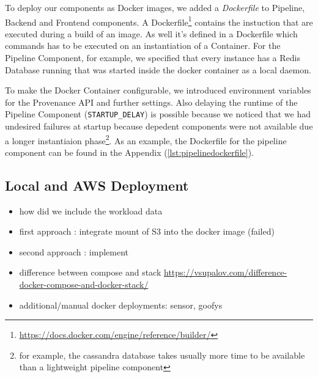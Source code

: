 To deploy our components as Docker images, we added a \emph{Dockerfile} to Pipeline, Backend and Frontend components. A Dockerfile\footnote{\url{https://docs.docker.com/engine/reference/builder/}} contains the instuction that are executed during a build of an image. As well it's defined in a Dockerfile which commands has to be executed on an instantiation of a Container. For the Pipeline Component, for example, we specified that every instance has a Redis Database running that was started inside the docker container as a local daemon.

To make the Docker Container configurable, we introduced environment variables for the Provenance API and further settings. Also delaying the runtime of the Pipeline Component (\texttt{STARTUP\_DELAY}) is possible because we noticed that we had undesired failures at startup because depedent components were not available due a longer instantiaion phase\footnote{for example, the cassandra database takes usually more time to be available than a lightweight pipeline component}. As an example, the Dockerfile for the pipeline component can be found in the Appendix (\ref{lst:pipelinedockerfile}).





\subsection{Local and AWS Deployment}






\begin{itemize}
	\item how did we include the workload data
	\item first approach : integrate mount of S3 into the docker image (failed)
	\item second approach : implement 
	
	\item difference between compose and stack \url{https://vsupalov.com/difference-docker-compose-and-docker-stack/}
\end{itemize}



\begin{itemize}
	\item additional/manual docker deployments: sensor, goofys
\end{itemize}
